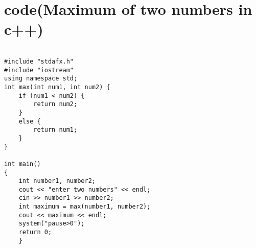 \documentclass[12pt]{article}
\begin{document}
\section{code(Maximum of two numbers in c++)}
\begin{lstlisting}

#include "stdafx.h"
#include "iostream"
using namespace std;
int max(int num1, int num2) {
	if (num1 < num2) {
		return num2;
	}
	else {
		return num1;
	}
}

int main() 
{
	int number1, number2;
	cout << "enter two numbers" << endl;
	cin >> number1 >> number2;
	int maximum = max(number1, number2);
	cout << maximum << endl;
	system("pause>0");
    return 0;
    }
\end{lstlisting}
\end{document}
